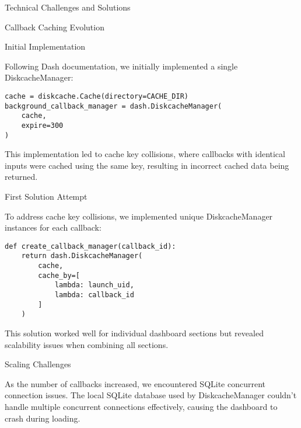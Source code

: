 \begin{section}{Technical Challenges and Solutions}
\begin{subsection}{Callback Caching Evolution}
		\begin{subsubsection}{Initial Implementation}
			\label{subsubsec:implementation-technical-challenges-caching-initial}

			Following Dash documentation\cite{plotly_dash_plotly_com_background_callbacks}, we initially implemented a single DiskcacheManager:

			\begin{listing}[H]
				\caption{Initial Cache Manager Setup}
				\begin{verbatim}
cache = diskcache.Cache(directory=CACHE_DIR)
background_callback_manager = dash.DiskcacheManager(
    cache,
    expire=300
)
				\end{verbatim}
				\label{lst:dashboard-implementation-cache-initial}
			\end{listing}

			This implementation led to cache key collisions, where callbacks with identical inputs were cached using the same key, resulting in incorrect cached data being returned.
		\end{subsubsection}

		\begin{subsubsection}{First Solution Attempt}
			\label{subsubsec:implementation-technical-challenges-caching-first}

			To address cache key collisions, we implemented unique DiskcacheManager instances for each callback:

			\begin{listing}[H]
				\caption{Unique Cache Managers Per Callback}
				\begin{verbatim}
def create_callback_manager(callback_id):
    return dash.DiskcacheManager(
        cache,
        cache_by=[
            lambda: launch_uid,
            lambda: callback_id
        ]
    )
				\end{verbatim}
				\label{lst:dashboard-implementation-cache-unique}
			\end{listing}

			This solution worked well for individual dashboard sections but revealed scalability issues when combining all sections.
		\end{subsubsection}

		\begin{subsubsection}{Scaling Challenges}
			\label{subsubsec:implementation-technical-challenges-caching-scaling}

			As the number of callbacks increased, we encountered SQLite concurrent connection issues.
			The local SQLite database used by DiskcacheManager\cite{gj_diskcache} couldn't handle multiple concurrent connections effectively, causing the dashboard to crash during loading.


\end{subsubsection}
\end{subsection}
\end{section}
